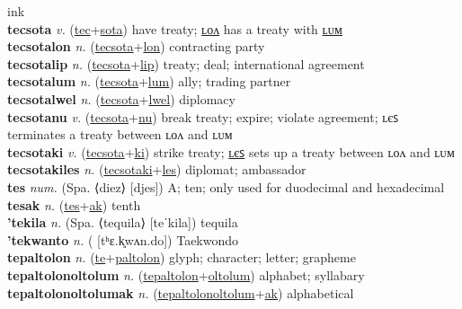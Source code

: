 ink \label{tecwelon} \\
\textbf{tecsota} \textit{v.} (\hyperref[tec]{tec}+\hyperref[sota]{sota})
have treaty; \hyperref[tecsotalon]{ʟᴏᴧ} has a treaty with \hyperref[tecsotalum]{ʟᴜᴍ} \label{tecsota} \\
\textbf{tecsotalon} \textit{n.} (\hyperref[tecsota]{tecsota}+\hyperref[lon]{lon})
contracting party \label{tecsotalon} \\
\textbf{tecsotalip} \textit{n.} (\hyperref[tecsota]{tecsota}+\hyperref[lip]{lip})
treaty; deal; international agreement \label{tecsotalip} \\
\textbf{tecsotalum} \textit{n.} (\hyperref[tecsota]{tecsota}+\hyperref[lum]{lum})
ally; trading partner \label{tecsotalum} \\
\textbf{tecsotalwel} \textit{n.} (\hyperref[tecsota]{tecsota}+\hyperref[lwel]{lwel})
diplomacy \label{tecsotalwel} \\
\textbf{tecsotanu} \textit{v.} (\hyperref[tecsota]{tecsota}+\hyperref[nu]{nu})
break treaty; expire; violate agreement; ʟєꜱ terminates a treaty between ʟᴏᴧ and ʟᴜᴍ \label{tecsotanu} \\
\textbf{tecsotaki} \textit{v.} (\hyperref[tecsota]{tecsota}+\hyperref[ki]{ki})
strike treaty; \hyperref[tecsotakiles]{ʟєꜱ} sets up a treaty between ʟᴏᴧ and ʟᴜᴍ \label{tecsotaki} \\
\textbf{tecsotakiles} \textit{n.} (\hyperref[tecsotaki]{tecsotaki}+\hyperref[les]{les})
diplomat; ambassador \label{tecsotakiles} \\
\textbf{tes} \textit{num.} (Spa. ⟨diez⟩ [djes])
A; ten; only used for duodecimal and hexadecimal \label{tes} \\
\textbf{tesak} \textit{n.} (\hyperref[tes]{tes}+\hyperref[ak]{ak})
tenth \label{tesak} \\
\textbf{'tekila} \textit{n.} (Spa. ⟨tequila⟩ [teˈkila])
tequila \label{'tekila} \\
\textbf{'tekwanto} \textit{n.} ( [tʰɛ.k͈wʌn.do])
Taekwondo \label{'tekwanto} \\
\textbf{tepaltolon} \textit{n.} (\hyperref[te]{te}+\hyperref[paltolon]{paltolon})
glyph; character; letter; grapheme \label{tepaltolon} \\
\textbf{tepaltolonoltolum} \textit{n.} (\hyperref[tepaltolon]{tepaltolon}+\hyperref[oltolum]{oltolum})
alphabet; syllabary \label{tepaltolonoltolum} \\
\textbf{tepaltolonoltolumak} \textit{n.} (\hyperref[tepaltolonoltolum]{tepaltolonoltolum}+\hyperref[ak]{ak})
alphabetical \label{tepaltolonoltolumak} \\
